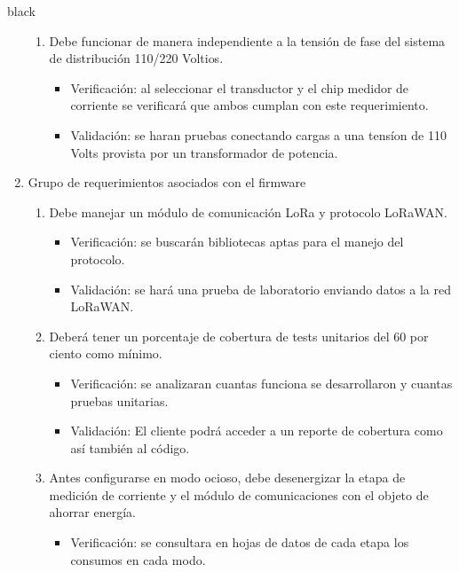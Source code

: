 \documentclass[11pt]{charter}
\begin{document}
\begin{consigna}{black}
\begin{enumerate}
\begin{enumerate}[label*=\arabic*.]
			\item Debe funcionar de manera independiente a la tensión de fase del sistema de distribución 110/220 Voltios.
				\begin{itemize}
					\item Verificación: al seleccionar el transductor y el chip medidor de corriente se verificará que ambos cumplan con este requerimiento.\\
					\item Validación: se haran pruebas conectando cargas a una tensíon de 110 Volts provista por un transformador de potencia.\\
				\end{itemize}			

	\end{enumerate}
	\item Grupo de requerimientos asociados con el firmware
		\begin{enumerate}[label*=\arabic*.]
			\item Debe manejar un módulo de comunicación LoRa y protocolo LoRaWAN.
				\begin{itemize}
					\item Verificación: se buscarán bibliotecas aptas para el manejo del protocolo.\\
					\item Validación: se hará una prueba de laboratorio enviando datos a la red LoRaWAN.\\
				\end{itemize}
			\item Deberá tener un porcentaje de cobertura de tests unitarios del 60 por ciento como mínimo.
				\begin{itemize}
					\item Verificación: se analizaran cuantas funciona se desarrollaron y cuantas pruebas unitarias.\\
					\item Validación: El cliente podrá acceder a un reporte de cobertura como así también al código.\\
				\end{itemize}
			\item Antes configurarse en modo ocioso, debe desenergizar la etapa de medición de corriente y el módulo de comunicaciones con el objeto de ahorrar energía.
				\begin{itemize}
					\item Verificación: se consultara en hojas de datos de cada etapa los consumos en cada modo.\\

\end{itemize}
\end{enumerate}
\end{enumerate}
\end{consigna}
\end{document}
